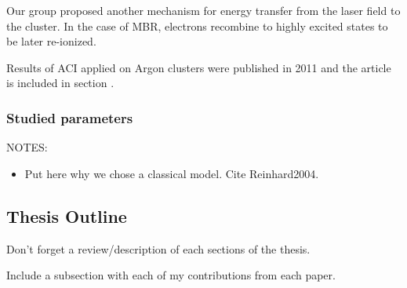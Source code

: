 Our group proposed another mechanism for energy transfer from the laser field
to the cluster. In the case of MBR, electrons recombine to highly excited
states to be later re-ionized. 


Results of ACI applied on Argon clusters were published in 2011 and the
article is included in section \label{section:papers:aci}.


\subsubsection{Studied parameters}
NOTES:
\begin{itemize}
\item Put here why we chose a classical model. Cite
Reinhard2004\cite{Reinhard2004}.
\end{itemize}






\subsection{Thesis Outline}
Don't forget a review/description of each sections of the thesis.

Include a subsection with each of my contributions from each paper.

